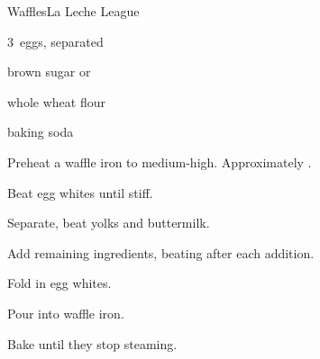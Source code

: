 \begin{recipe}{Waffles}{La Leche League}{}

\begin{ingredients}
\item 3~eggs, separated
\item \C{1\half} 
\item {} brown sugar or 
\item {} whole wheat flour
\item \tp{\half} baking soda
\item {}
\end{ingredients}

\begin{directions}
\item Preheat a waffle iron to medium-high. Approximately .
\item Beat egg whites until stiff.
\item Separate, beat yolks and buttermilk.
\item Add remaining ingredients, beating after each addition.
\item Fold in egg whites.
\item Pour into waffle iron.
\item Bake until they stop steaming.
\end{directions}

\end{recipe}
